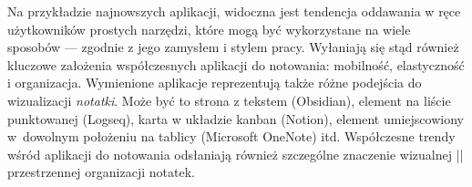 Na przykładzie najnowszych aplikacji, widoczna jest tendencja oddawania w ręce użytkowników prostych narzędzi,
które mogą być wykorzystane na wiele sposobów — zgodnie z jego zamysłem i stylem pracy.
Wyłaniają się stąd również kluczowe założenia współczesnych aplikacji do notowania: mobilność, elastyczność i organizacja.
Wymienione aplikacje reprezentują także różne podejścia do wizualizacji \textit{notatki}.
Może być to strona z tekstem (Obsidian), element na liście punktowanej (Logseq), karta w układzie kanban (Notion),
element umiejscowiony w~dowolnym położeniu na tablicy (Microsoft OneNote) itd.
Współczesne trendy wśród aplikacji do notowania odsłaniają również szczególne znaczenie wizualnej || przestrzennej organizacji notatek.